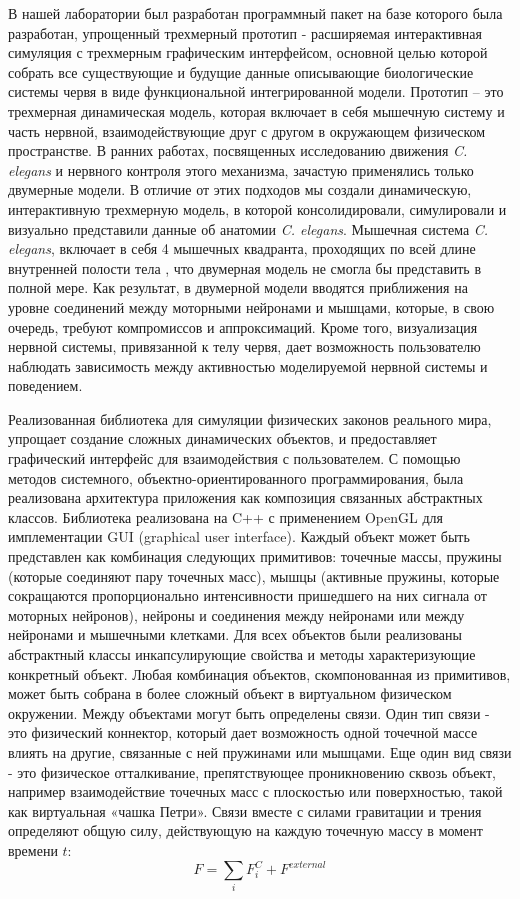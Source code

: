 В нашей лаборатории был разработан программный пакет \cite {Palyanov2012} на базе которого была разработан, упрощенный трехмерный прототип - расширяемая интерактивная симуляция с трехмерным графическим интерфейсом, основной целью которой собрать все существующие и будущие данные описывающие биологические системы червя в виде функциональной интегрированной модели. Прототип – это трехмерная динамическая модель, которая включает в себя мышечную систему и часть нервной, взаимодействующие друг с другом в окружающем физическом пространстве. В ранних работах, посвященных исследованию движения \textit{C. elegans} и нервного контроля этого механизма, зачастую применялись только двумерные модели. В отличие от этих подходов мы создали динамическую, интерактивную трехмерную модель, в которой консолидировали,  симулировали и визуально представили данные об анатомии \textit{C. elegans}. Мышечная система \textit{C. elegans}, включает в себя 4 мышечных квадранта, проходящих по всей длине внутренней полости тела \cite {White1986}, что двумерная модель не смогла бы представить в полной мере. Как результат, в двумерной модели вводятся приближения на уровне соединений между моторными нейронами и мышцами, которые, в свою очередь, требуют компромиссов и аппроксимаций. Кроме того, визуализация нервной системы, привязанной к телу червя, дает возможность пользователю наблюдать зависимость между активностью моделируемой нервной системы и поведением.

Реализованная библиотека для симуляции физических законов реального мира, упрощает создание сложных динамических объектов, и предоставляет графический интерфейс для взаимодействия с пользователем. С помощью методов системного, объектно-ориенти­рованного программирования, была реализована архитектура приложения как композиция связанных абстрактных классов. Библиотека реализована на C++ с применением OpenGL для имплементации GUI (graphical user interface). Каждый объект может быть представлен как комбинация следующих примитивов: точечные массы, пружины (которые соединяют пару точечных масс), мышцы (активные пружины, которые сокращаются пропорционально интенсивности пришедшего на них сигнала от моторных нейронов), нейроны и соединения между нейронами или между нейронами и мышечными клетками. Для всех объектов были реализованы абстрактный классы инкапсулирующие свойства и методы характеризующие конкретный объект. Любая комбинация объектов, скомпонованная из примитивов, может быть собрана в более сложный объект в виртуальном физическом окружении. Между объектами могут быть определены связи. Один тип связи - это физический коннектор, который дает возможность одной точечной массе влиять на другие, связанные с ней пружинами или мышцами. Еще один вид связи - это физическое отталкивание, препятствующее проникновению сквозь объект, например взаимодействие точечных масс с плоскостью или поверхностью, такой как виртуальная «чашка Петри». Связи вместе с силами гравитации и трения определяют общую силу, действующую на каждую точечную массу в момент времени \( t \):
\[
  F=\sum_{i} F_{i}^C + F^{external}
\]


